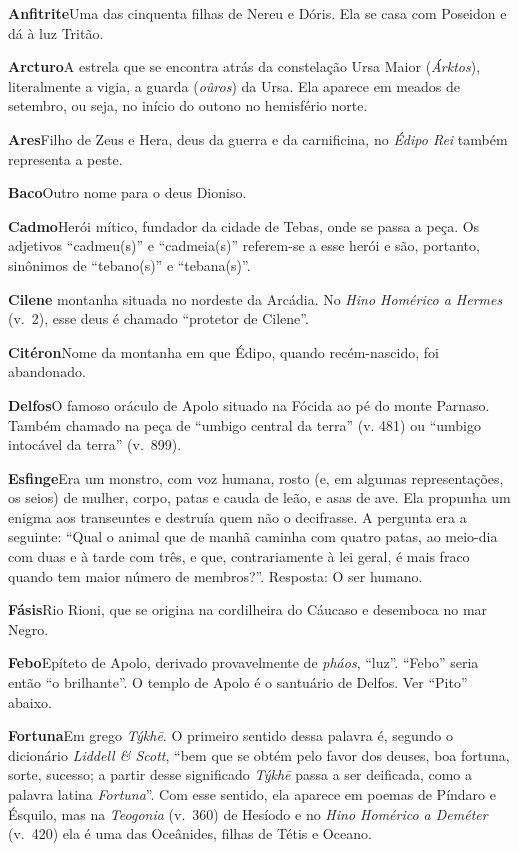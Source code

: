 \textbf{Anfitrite}\quad Uma das cinquenta filhas de Nereu e Dóris. Ela se
casa com Poseidon e dá à luz Tritão.

\textbf{Arcturo}\quad A estrela que se encontra atrás da constelação Ursa
Maior (\emph{Árktos}), literalmente a vigia, a guarda (\emph{oûros}) da
Ursa. Ela aparece em meados de setembro, ou seja, no início do outono no
hemisfério norte.

\textbf{Ares}\quad Filho de Zeus e Hera, deus da guerra e da carnificina,
no \emph{Édipo Rei} também representa a peste.

\textbf{Baco}\quad Outro nome para o deus Dioniso.

\textbf{Cadmo}\quad Herói mítico, fundador da cidade de Tebas, onde se
passa a peça. Os adjetivos ``cadmeu(s)'' e ``cadmeia(s)'' referem-se a
esse herói e são, portanto, sinônimos de ``tebano(s)'' e ``tebana(s)''.

\textbf{Cilene\quad} montanha situada no nordeste da Arcádia. No
\emph{Hino Homérico a Hermes} (v.~2), esse deus é chamado ``protetor de
Cilene''.

\textbf{Citéron}\quad Nome da montanha em que Édipo, quando
recém-nascido, foi abandonado.

\textbf{Delfos}\quad O famoso oráculo de Apolo situado na Fócida ao pé do
monte Parnaso. Também chamado na peça de ``umbigo central da terra'' (v.
481) ou ``umbigo intocável da terra'' (v.~899).

\textbf{Esfinge}\quad Era um monstro, com voz humana, rosto (e, em
algumas representações, os seios) de mulher, corpo, patas e cauda de
leão, e asas de ave. Ela propunha um enigma aos transeuntes e destruía
quem não o decifrasse. A pergunta era a seguinte: ``Qual o animal que de
manhã caminha com quatro patas, ao meio-dia com duas e à tarde com três,
e que, contrariamente à lei geral, é mais fraco quando tem maior número
de membros?''. Resposta: O ser humano.

\textbf{Fásis}\quad Rio Rioni, que se origina na cordilheira do Cáucaso
e desemboca no mar Negro.

\textbf{Febo}\quad Epíteto de Apolo, derivado provavelmente de
\emph{pháos}, ``luz''. ``Febo'' seria então ``o brilhante''. O templo de
Apolo é o santuário de Delfos. Ver ``Pito'' abaixo.

\textbf{Fortuna}\quad Em grego \emph{Týkhē}. O primeiro sentido dessa
palavra é, segundo o dicionário \emph{Liddell \& Scott}, ``bem que se
obtém pelo favor dos deuses, boa fortuna, sorte, sucesso; a partir desse
significado \emph{Týkhē} passa a ser deificada, como a palavra latina
\emph{Fortuna}''. Com esse sentido, ela aparece em poemas de Píndaro e
Ésquilo, mas na \emph{Teogonia} (v.~360) de Hesíodo e no \emph{Hino
Homérico a Deméter} (v.~420) ela é uma das Oceânides, filhas de Tétis e
Oceano.

